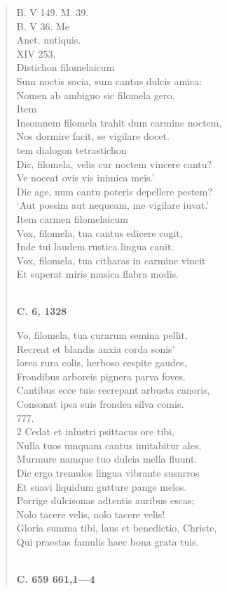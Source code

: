 \documentclass[11pt, a4paper]{report}
\begin{document}
      \begin{verse}
      B. V 149. M. 39. \\ B. V 36. Me \\ Anct. nntiquis. \\ XIV 253. \\ Distichon filomelaicum \\ Sum noctis socia, sum cantus dulcis amica: \\ Nomen ab ambiguo sic filomela gero. \\ Item \\ Insomnem filomela trahit dum carmine noctem, \\ Nos dormire facit, se vigilare docet. \\ tem dialogon tetrastichon \\ Dic, filomela, velis cur noctem vincere cantu? \\ Ve noceat ovis vis inimica meis.’ \\ Dic age, num cantu poteris depellere pestem? \\ ‘Aut possim aut nequeam, me vigilare iuvat.’ \\ Item carmen filomelaicum \\ Vox, filomela, tua cantus edicere cogit, \\ Inde tui laudem rustica lingua canit. \\ Vox, filomela, tua citharas in carmine vincit \\ Et superat miris musica flabra modis. \\ 
        ﻿\pagebreak 
    \begin{center} \textbf{C. 6, 1328} \end{center} \marginpar{[1]} Vo, filomela, tua curarum semina pellit, \\ Recreat et blandis anxia corda sonis’ \\ lorea rura colis, herboso cespite gaudes, \\ Frondibus arboreis pignera parva foves. \\ Cantibus ecce tuis recrepant arbusta canoris, \\ Consonat ipsa suis frondea silva comis. \\ 777. \\ 2 Cedat et inlustri psittacus ore tibi, \\ Nulla tuos umquam cantus imitabitur ales, \\ Murmure namque tuo dulcia mella fluunt. \\ Dic ergo tremulos lingua vibrante susnrros \\ Et suavi liquidum gutture pange melos. \\ Porrige dulcisonas adtentis auribus escas; \\ Nolo tacere velis, nolo tacere velis! \\ Gloria summa tibi, laus et benedictio, Christe, \\ Qui praestas famulis haec bona grata tuis. \\ 
        ﻿\pagebreak 
    \begin{center} \textbf{C. 659 661,1—4} \end{center} \marginpar{[132]} 
      \end{verse}
  
\end{document}
